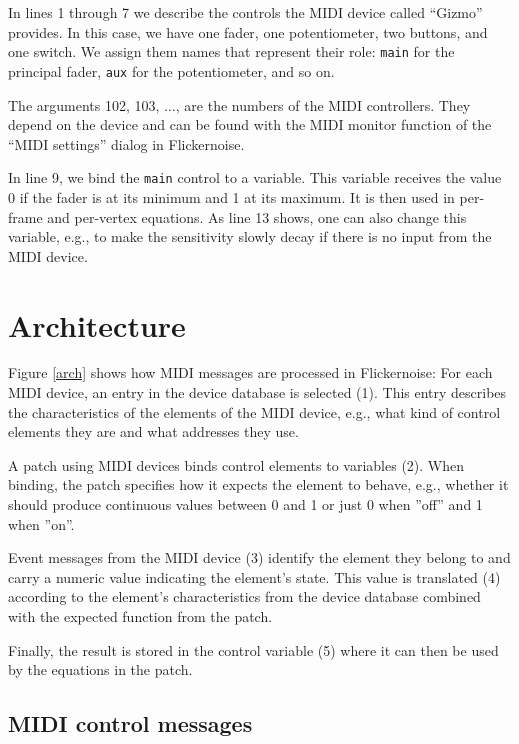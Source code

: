 \documentclass[11pt,a4paper]{article}
\begin{document}
In lines 1 through 7 we describe the controls the MIDI device called
``Gizmo'' provides. In this case, we have one fader, one potentiometer,
two buttons, and one switch. We assign them names that represent their
role: {\tt main}
for the principal fader, {\tt aux} for the potentiometer, and so on.

The arguments 102, 103, $\ldots$, are the numbers of the MIDI controllers.
They depend on the device and can be found with the MIDI monitor function
of the ``MIDI settings'' dialog in Flickernoise.

In line 9, we bind the {\tt main} control to a variable. This variable
receives the value 0 if the fader is at its minimum and 1 at its maximum.
It is
then used in per-frame and per-vertex equations. As line 13 shows, one
can also change this variable, e.g., to make the sensitivity slowly decay
if there is no input from the MIDI device.




\figarch


\section{Architecture}

Figure \ref{arch} shows how MIDI messages are processed in Flickernoise:
For each MIDI device, an entry in the device database is selected (1).
This entry describes the characteristics of the elements of the MIDI
device, e.g., what kind of control elements they are and what
addresses they use.

A patch using MIDI devices binds control elements to variables (2).
When binding, the patch specifies how it expects the element to
behave, e.g., whether it should produce continuous values between
0 and 1 or just 0 when ''off'' and 1 when ''on''.

Event messages from the MIDI device (3) identify the element they
belong to and carry a numeric value indicating the element's state.
This value is translated (4) according to the element's characteristics
from the device database combined with the expected function from
the patch.

Finally, the result is stored in the control variable (5) where it can
then be used by the equations in the patch.




\subsection{MIDI control messages}
\end{document}
